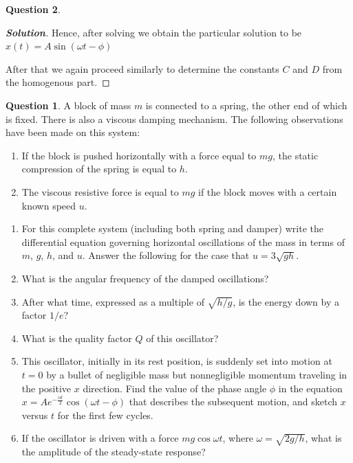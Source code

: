 \documentclass[10pt]{scrartcl}
\theoremstyle{definition}
\newtheorem{exercise}{Question}
\newenvironment{solution} {\begin{proof}[\normalfont \textbf{Solution}]} {\end{proof}}
\begin{document}
\begin{exercise}
\begin{solution}
        Hence, after solving we obtain the particular solution to be $x(t) = A \sin \left(\omega t - \phi\right)$

        After that we again proceed similarly to determine the constants $C$ and $D$ from the homogenous part.
    \end{solution}
    \begin{exercise}
        A block of mass $m$ is connected to a spring, the other end of which is fixed. There is also a
        viscous damping mechanism. The following observations have been made on this system:
        \begin{enumerate}
            \item If the block is pushed horizontally with a force equal to $mg$, the static compression of the spring is equal to $h$.
            \item The viscous resistive force is equal to $mg$ if the block moves with a certain known speed $u$.
        \end{enumerate}
        \begin{enumerate}[label = {(\alph*)}]
            \item For this complete system (including both spring and damper) write the differential equation governing horizontal oscillations of the mass in terms of $m$, $g$, $h$, and $u$.
            Answer the following for the case that $u = 3\sqrt{gh}$.
            \item What is the angular frequency of the damped oscillations?
            \item After what time, expressed as a multiple of $\sqrt{h/g}$, is the energy down by a factor $1/e$?
            \item What is the quality factor $Q$ of this oscillator?
            \item  This oscillator, initially in its rest position, is suddenly set into motion at $t = 0$ by a bullet
            of negligible mass but nonnegligible momentum traveling in the positive $x$ direction. Find
            the value of the phase angle $\phi$ in the equation $x = Ae^{-\frac{\alpha t}{2}} \cos(\omega t - \phi)$ that describes the
            subsequent motion, and sketch $x$ versus $t$ for the first few cycles.
            \item If the oscillator is driven with a force $mg \cos \omega t$, where $\omega = \sqrt{2g/h}$, what is the amplitude
            of the steady-state response?
        \end{enumerate}
    \end{exercise}

\end{exercise}
\end{document}
